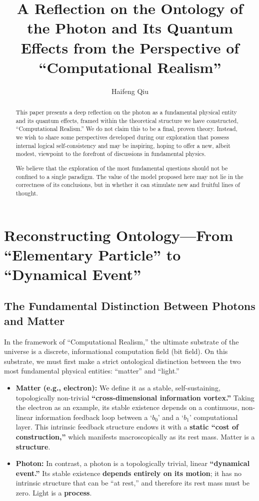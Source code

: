 \documentclass[11pt, a4paper]{article}
\title{A Reflection on the Ontology of the Photon and Its Quantum Effects from the Perspective of ``Computational Realism''}
\author{Haifeng Qiu}
\begin{document}
\maketitle

\begin{abstract}
This paper presents a deep reflection on the photon as a fundamental physical entity and its quantum effects, framed within the theoretical structure we have constructed, ``Computational Realism.'' We do not claim this to be a final, proven theory. Instead, we wish to share some perspectives developed during our exploration that possess internal logical self-consistency and may be inspiring, hoping to offer a new, albeit modest, viewpoint to the forefront of discussions in fundamental physics.

We believe that the exploration of the most fundamental questions should not be confined to a single paradigm. The value of the model proposed here may not lie in the correctness of its conclusions, but in whether it can stimulate new and fruitful lines of thought.
\end{abstract}

\section{Reconstructing Ontology---From ``Elementary Particle'' to ``Dynamical Event''}

\subsection{The Fundamental Distinction Between Photons and Matter}

In the framework of ``Computational Realism,'' the ultimate substrate of the universe is a discrete, informational computation field (bit field). On this substrate, we must first make a strict ontological distinction between the two most fundamental physical entities: ``matter'' and ``light.''

\begin{itemize}
    \item \textbf{Matter (e.g., electron):} We define it as a stable, self-sustaining, topologically non-trivial \textbf{``cross-dimensional information vortex.''} Taking the electron as an example, its stable existence depends on a continuous, non-linear information feedback loop between a `$b_0$' and a `$b_1$' computational layer. This intrinsic feedback structure endows it with a \textbf{static ``cost of construction,''} which manifests macroscopically as its rest mass. Matter is a \textbf{structure}.

    \item \textbf{Photon:} In contrast, a photon is a topologically trivial, linear \textbf{``dynamical event.''} Its stable existence \textbf{depends entirely on its motion}; it has no intrinsic structure that can be ``at rest,'' and therefore its rest mass must be zero. Light is a \textbf{process}.
\end{itemize}
\end{document}
